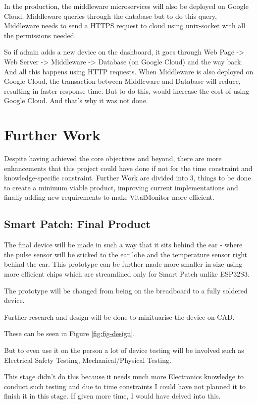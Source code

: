 In the production, the middleware microservices will also be deployed on Google Cloud. Middleware queries through the database but to do this query, Middleware needs to send a HTTPS request to cloud using unix-socket with all the permissions needed. 

So if admin adds a new device on the dashboard, it goes through Web Page -> Web Server -> Middleware -> Database (on Google Cloud) and the way back. And all this happens using HTTP requests. When Middleware is also deployed on Google Cloud, the transaction between Middleware and Database will reduce, resulting in faster response time. But to do this, would increase the cost of using Google Cloud. And that's why it was not done.


\section{Further Work}
Despite having achieved the core objectives and beyond, there are more enhancements that this project could have done if not for the time constraint and knowledge-specific constraint. Further Work are divided into 3, things to be done to create a minimum viable product, improving current implementations and finally adding new requirements to make VitalMonitor more efficient.

\subsection{Smart Patch: Final Product}
The final device will be made in such a way that it sits behind the ear - where the pulse sensor will be sticked to the ear lobe and the temperature sensor right behind the ear. This prototype can be further made more smaller in size using more efficient chips which are streamlined only for Smart Patch unlike ESP32S3. 

The prototype will be changed from being on the breadboard to a fully soldered device. 

Further research and design will be done to minituarise the device on CAD. 

These can be seen in Figure \ref{fig:fig-design}.

But to even use it on the person a lot of device testing will be involved such as Electrical Safety Testing, Mechanical/Physical Testing. 

This stage didn't do this because it needs much more Electronics knowledge to conduct such testing and due to time constraints I could have not planned it to finish it in this stage. If given more time, I would have delved into this. 

